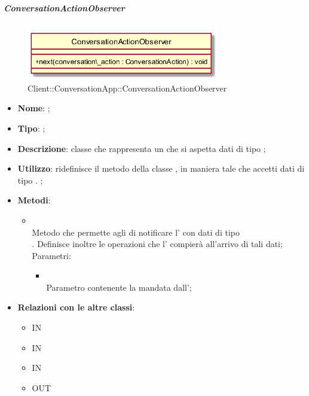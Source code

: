 \hypertarget{ConversationActionObserver_label}{\subparagraph{ConversationActionObserver}}
\begin{figure}[h]
	\centering
	\includegraphics[width=0.75\textwidth,height=\textheight,keepaspectratio]{images/ClassConversationActionObserver.png}
	\caption{Client::ConversationApp::ConversationActionObserver}
\end{figure}
\begin{itemize}
	\item \textbf{Nome}: ;
	\item \textbf{Tipo}: ;
	\item \textbf{Descrizione}: classe che rappresenta un  che si aspetta dati di tipo ;
	\item \textbf{Utilizzo}: ridefinisce il metodo  della classe , in maniera tale che accetti dati di tipo .
	;
	\item \textbf{Metodi}:
	\begin{itemize}
		\item[]  \\		Metodo che permette agli  di notificare l' con dati di tipo \\ . Definisce inoltre le operazioni che l' compierà all'arrivo di tali dati;\\
		Parametri:
		\begin{itemize}
			\item {} \\
			Parametro contenente la  mandata dall';
		\end{itemize}
	\end{itemize}
	\item \textbf{Relazioni con le altre classi}:
	\begin{itemize}
		\item IN \hyperlink{ConversationActionObservable_label}{}
		\item IN \hyperlink{ConversationActionSubject_label}{}
		\item IN \hyperlink{MessageStore_label}{}
		\item OUT \hyperlink{ConversationAction_label}{}
	\end{itemize}
\end{itemize}
\FloatBarrier

